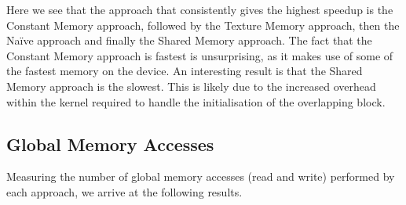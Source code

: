 \documentclass[10pt]{article}
\begin{document}
Here we see that the approach that consistently gives the highest speedup is the Constant Memory approach, followed by the Texture Memory approach, then the Na\"{i}ve approach and finally the Shared Memory approach. The fact that the Constant Memory approach is fastest is unsurprising, as it makes use of some of the fastest memory on the device. An interesting result is that the Shared Memory approach is the slowest. This is likely due to the increased overhead within the kernel required to handle the initialisation of the overlapping block.
\subsection{Global Memory Accesses}
Measuring the number of global memory accesses (read and write) performed by each approach, we arrive at the following results.
\end{document}
